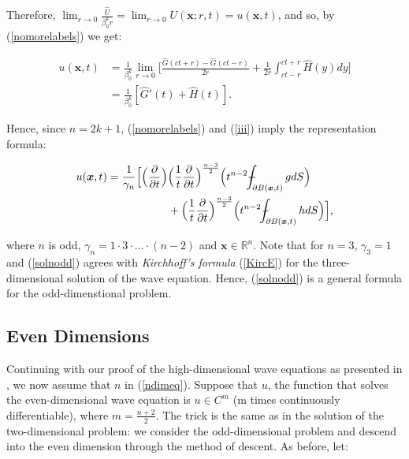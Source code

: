 \documentclass[a4paper, 12pt]{article}
\def\Xint#1{\mathchoice
{\XXint\displaystyle\textstyle{#1}}%
{\XXint\textstyle\scriptstyle{#1}}%
{\XXint\scriptstyle\scriptscriptstyle{#1}}%
{\XXint\scriptscriptstyle\scriptscriptstyle{#1}}%
\!\int}
\def\XXint#1#2#3{{\setbox0=\hbox{$#1{#2#3}{\int}$ }
\vcenter{\hbox{$#2#3$ }}\kern-.6\wd0}}
\def\dashint{\Xint-}
\numberwithin{equation}{section}
\begin{document}
Therefore, $\lim_{r \rightarrow 0} \frac{\hat{U}}{\beta_0^k r}=\lim_{r
\rightarrow 0} U(\boldsymbol{x}; r, t)=u(\boldsymbol{x}, t)$, and so, by
(\ref{nomorelabels}) we get:

\begin{equation*}
    \begin{aligned}
        u(\boldsymbol{x}, t)&=\frac{1}{\beta_0^k} \lim_{r \rightarrow 0}\Big[\frac{\hat{G}(ct+r)-\hat{G}(ct-r)}{2r} + \frac{1}{2r}\int_{ct-r}^{ct+r} \hat{H}(y)dy\Big]\\
        &= \frac{1}{\beta_0^k}[\hat{G}'(t)+\hat{H}(t)].
    \end{aligned}
\end{equation*}

Hence, since $n=2k+1$, (\ref{nomorelabels}) and (\ref{iii}) imply the
representation formula:

\begin{equation} \label{solnodd}
    \begin{split}
        u(\boldsymbol{x}, t)=\frac{1}{\gamma_n}\Big[\Big(\diffp[1]{}{t}\Big) & \Big(\frac{1}{t} \diffp[1]{}{t} \Big)^{\frac{n-3}{2}}\Big(t^{n-2} \dashint_{\partial B(\boldsymbol{x},t)}gdS \Big)\\
        &+ \Big(\frac{1}{t} \diffp[1]{}{t} \Big)^{\frac{n-3}{2}}\Big(t^{n-2} \dashint_{\partial B(\boldsymbol{x},t)}hdS \Big)\Big],
    \end{split}
\end{equation} 

where $n$ is odd, $\gamma_n=1 \cdot 3 \cdot ... \cdot (n-2)$ and
$\boldsymbol{x}\in \mathbb{R}^n$. Note that for $n=3$, $\gamma_3 = 1$ and
(\ref{solnodd}) agrees with \emph{Kirchhoff's formula} (\ref{KircE}) for the
three-dimensional solution of the wave equation. Hence, (\ref{solnodd}) is a
general formula for the odd-dimenstional problem.

\subsection{Even Dimensions}
Continuing with our proof of the high-dimensional wave equations as presented in
\cite{Ev}, we now assume that $n$ in (\ref{ndimeq}). Suppose that $u$, the
function that solves the even-dimensional wave equation is $u \in C^m$ (m times
continuously differentiable), where $m=\frac{n+2}{2}$. The trick is the same as
in the solution of the two-dimensional problem: we consider the odd-dimensional
problem and descend into the even dimension through the method of descent. As
before, let:
\end{document}
